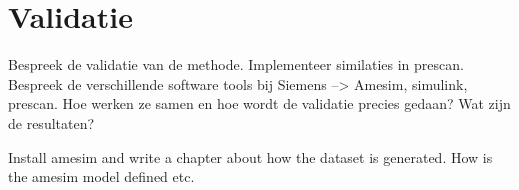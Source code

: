\chapter{Validatie}
\label{cha:5}

Bespreek de validatie van de methode. Implementeer similaties in prescan.
Bespreek de verschillende software tools bij Siemens --> Amesim, simulink, prescan.
Hoe werken ze samen en hoe wordt de validatie precies gedaan? Wat zijn de resultaten?

Install amesim and write a chapter about how the dataset is generated. How is the amesim model defined etc. 



%		




















